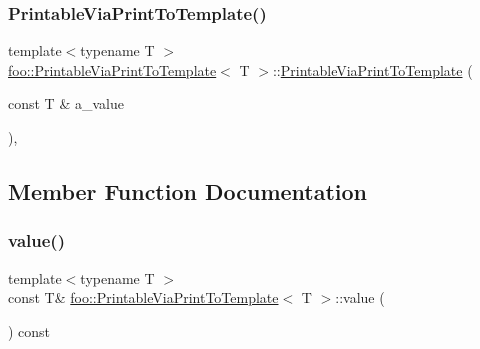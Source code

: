 \subsubsection{\texorpdfstring{PrintableViaPrintToTemplate()}{PrintableViaPrintToTemplate()}\hspace{0.1cm}{\footnotesize\ttfamily [3/3]}}
{\footnotesize\ttfamily template$<$typename T $>$ \\
\mbox{\hyperlink{classfoo_1_1_printable_via_print_to_template}{foo\+::\+Printable\+Via\+Print\+To\+Template}}$<$ T $>$\+::\mbox{\hyperlink{classfoo_1_1_printable_via_print_to_template}{Printable\+Via\+Print\+To\+Template}} (\begin{DoxyParamCaption}\item[{const T \&}]{a\+\_\+value }\end{DoxyParamCaption})\hspace{0.3cm}{\ttfamily [inline]}, {\ttfamily [explicit]}}



\subsection{Member Function Documentation}
\mbox{\label{classfoo_1_1_printable_via_print_to_template_a14e0fcac9ae264e37e6212994b2920f6}} 
\subsubsection{\texorpdfstring{value()}{value()}\hspace{0.1cm}{\footnotesize\ttfamily [1/3]}}
{\footnotesize\ttfamily template$<$typename T $>$ \\
const T\& \mbox{\hyperlink{classfoo_1_1_printable_via_print_to_template}{foo\+::\+Printable\+Via\+Print\+To\+Template}}$<$ T $>$\+::value (\begin{DoxyParamCaption}{ }\end{DoxyParamCaption}) const\hspace{0.3cm}{\ttfamily [inline]}}

\mbox{\label{classfoo_1_1_printable_via_print_to_template_a14e0fcac9ae264e37e6212994b2920f6}} 
